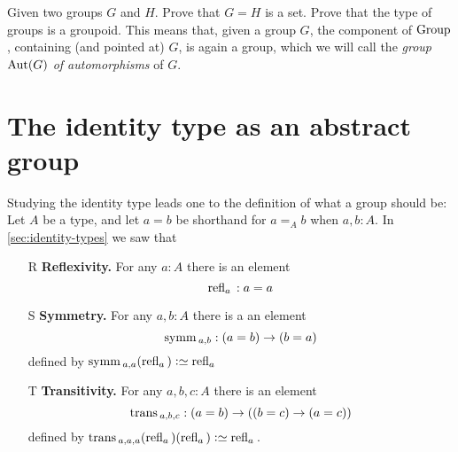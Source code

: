   \begin{xca}\label{xca:typegroupisgroupoid}
    Given two groups $G$ and $H$.  Prove that $G=H$ is a set.   Prove that the type of groups is a groupoid.  This means that, given a group $G$, the component of $\mathrm{Group}$, containing (and pointed at) $G$, is again a group, which we will call the \emph{group $\aut(G)$ of automorphisms} of $G$.
  \end{xca}

\section{The identity type as an abstract group }
\label{sec:identity-type-as-abstract}

Studying the identity type leads one to the definition of what a group should be:
Let $A$ be a type, and let $a=b$ be shorthand for $a=_Ab$ when $a,b:A$.  In \cref{sec:identity-types} we saw that
\begin{enumerate}
\item[R] {\bf Reflexivity.} For any $a:A$ there is an element
$$\refl a{}:a=a$$ 
\item[S] {\bf Symmetry.} For any $a,b:A$ there is a an element $$\symm{}_{a,b}:(a=b)\to (b=a)$$ defined by $\symm{}_{a,a}(\refl a{})\defequi\refl a{}$
\item[T] {\bf Transitivity.} For any $a,b,c:A$ there is an element $$\trans{}_{a,b,c}:(a=b)\to((b=c)\to(a=c))$$ defined by $\trans{}_{a,a,a}(\refl a{})(\refl a{})\defequi \refl a{}$.
\end{enumerate}

